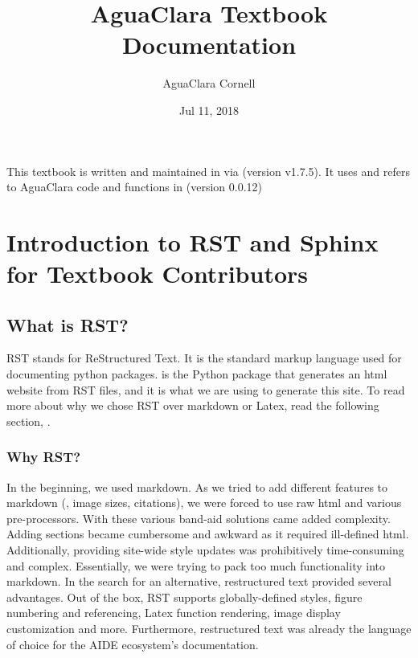 \documentclass[letterpaper,10pt,english]{sphinxmanual}
\title{AguaClara Textbook Documentation}
\date{Jul 11, 2018}
\author{AguaClara Cornell}
\begin{document}
\maketitle
\sphinxtableofcontents
{}\label{\detokenize{index::doc}}


This textbook is written and maintained in  via  (version v1.7.5). It uses and refers to AguaClara code and functions in  (version 0.0.12)


\chapter{Introduction to RST and Sphinx for Textbook Contributors}
\label{\detokenize{Textbook_Creation_Help/rst_intro:introduction-to-rst-and-sphinx-for-textbook-contributors}}\label{\detokenize{Textbook_Creation_Help/rst_intro:rst-intro}}\label{\detokenize{Textbook_Creation_Help/rst_intro::doc}}

\section{What is RST?}
\label{\detokenize{Textbook_Creation_Help/rst_intro:what-is-rst}}\label{\detokenize{Textbook_Creation_Help/rst_intro:id1}}
RST stands for ReStructured Text. It is the standard markup language used for documenting python packages.  is the Python package that generates an html website from RST files, and it is what we are using to generate this site. To read more about why we chose RST over markdown or Latex, read the following section, {\hyperref[\detokenize{Textbook_Creation_Help/rst_intro:why-rst}]{}}.


\subsection{Why RST?}
\label{\detokenize{Textbook_Creation_Help/rst_intro:why-rst}}\label{\detokenize{Textbook_Creation_Help/rst_intro:id2}}
In the beginning, we used markdown. As we tried to add different features to markdown (, image sizes, citations), we were forced to use raw html and various pre-processors. With these various band-aid solutions came added complexity. Adding sections became cumbersome and awkward as it required ill-defined html. Additionally, providing site-wide style updates was prohibitively time-consuming and complex. Essentially, we were trying to pack too much functionality into markdown. In the search for an alternative, restructured text provided several advantages. Out of the box, RST supports globally-defined styles, figure numbering and referencing, Latex function rendering, image display customization and more. Furthermore, restructured text was already the language of choice for the AIDE ecosystem’s documentation.
\end{document}
